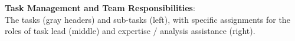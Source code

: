 
\begin{NOTANONtasks}
\caption{\normalsize\textbf{Task Management and Team Responsibilities}:\\
The tasks (gray headers) and sub-tasks (left), with specific assignments for the roles of task lead (middle) and expertise / analysis assistance (right).} \label{tab:NOTANONtasks}
\end{NOTANONtasks}
